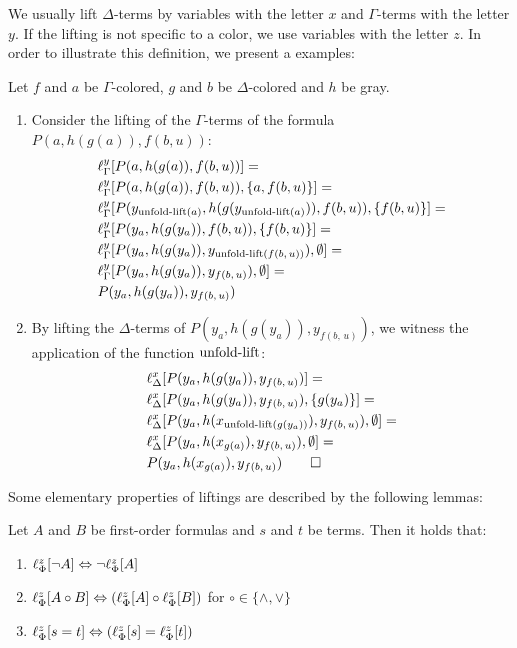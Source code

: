 We usually lift $\Delta$-terms by variables with the letter $x$ and $\Gamma$-terms with the letter\nolinebreak{} $y$. If the lifting is not specific to a color, we use variables with the letter\nolinebreak{} $z$.
In order to illustrate this definition, we present a examples:

\begin{exa}
	Let $f$ and $a$ be $\Gamma$-colored, $g$ and $b$ be $\Delta$-colored and $h$ be gray.
	\begin{enumerate}
		\item
			Consider the lifting of the $\Gamma$-terms of the formula $P(a, h(g(a)), f(b, u))$:
			\begin{align*}
				& \lifgamma{ P(a, h(g(a)), f(b, u)) } = \\
		 & \lifgamma{ P(a, h(g(a)), f(b, u)), \{a, f(b, u)\} } = \\
		 & \lifgamma{ P(y_{\expa(a)}, h(g(y_{\expa(a)})), f(b, u)), \{f(b, u)\} } = \\
		& \lifgamma{ P(y_a, h(g(y_a)), f(b, u)), \{f(b, u)\} } = \\
		& \lifgamma{ P(y_a, h(g(y_a)), y_{\expa(f(b,\,u))}), \emptyset } = \\
		& \lifgamma{ P(y_a, h(g(y_a)), y_{f(b,\,u)}), \emptyset } = \\
		& P(y_a, h(g(y_a)), y_{f(b,\,u)})
			\end{align*}

		\item
			By lifting the $\Delta$-terms of $P(y_a, h(g(y_a)), y_{f(b,\,u)})$, we witness the application of the function $\expa$:
			\begin{align*}
				& \lifdelta{ P(y_a, h(g(y_a)), y_{f(b,\,u)}) } = \\
			& \lifdelta{ P(y_a, h(g(y_a)), y_{f(b,\,u)}), \{g(y_a)\} } = \\
		 & \lifdelta{P(y_a, h(x_{\expa(g(y_a))}), y_{f(b,\,u)}), \emptyset } = \\
		 & \lifdelta{P(y_a, h(x_{g(a)}), y_{f(b,\,u)}), \emptyset } = \\
		 & P(y_a, h(x_{g(a)}), y_{f(b,\,u)})
			\qedhere
			\end{align*}
	\end{enumerate}
\end{exa}

Some elementary properties of liftings are described by the following lemmas:


\begin{lemma}
	\label{lemma:lift_logic_commute}
	Let $A$ and $B$ be first-order formulas and $s$ and $t$ be terms. Then it holds that:
	\begin{enumerate}
		\item $\lift{\Phi}{\lnot A}{z} \spas\semiff{} \lnot \lift{\Phi}{A}{z}$
		\item $\lift{\Phi}{A \circ B}{z} \spas\semiff{} ( \lift{\Phi}{A}{z} \circ \lift{\Phi}{B}{z} )$ for $\circ \in \{\land, \lor\}$
		\item $\lift{\Phi}{s = t}{z} \spas\semiff{} ( \lift{\Phi}{s}{z} = \lift{\Phi}{t}{z} )$
			\hfill\lemmaqed
	\end{enumerate}
\end{lemma}


